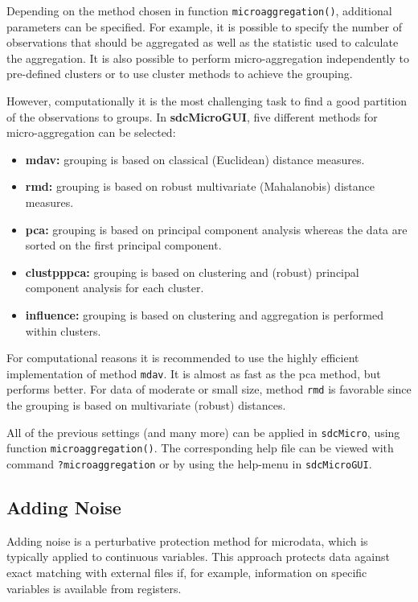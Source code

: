 \documentclass[12pt]{scrartcl}\usepackage[]{graphicx}\usepackage[]{color}
\newcommand{\pkg}[1]{\textbf{#1}}
\newcommand{\sdcMicro}{\texttt{sdcMicro}}
\newcommand{\sdcMicroGUI}{\texttt{sdcMicroGUI}}
\begin{document}
Depending on the method chosen in function \lstinline{microaggregation()}, additional parameters can be specified. For example, it is possible to specify the number of observations that should be aggregated as well as the statistic used to calculate the aggregation. It is also possible to perform micro-aggregation independently to pre-defined clusters or to use cluster methods to achieve the grouping.

However, computationally it is the most challenging task to find a good partition of the observations to groups. In \pkg{sdcMicroGUI}, five different methods for micro-aggregation can be selected:

\begin{itemize}
\item \textbf{mdav:} grouping is based on classical (Euclidean) distance measures.
\item \textbf{rmd:} grouping is based on robust multivariate (Mahalanobis) distance measures.
\item \textbf{pca:} grouping is based on principal component analysis whereas the data are sorted on the first principal component.
\item \textbf{clustpppca:} grouping is based on clustering and (robust) principal component analysis for each cluster.
\item \textbf{influence:} grouping is based on clustering and aggregation is performed within clusters.
\end{itemize}

For computational reasons it is recommended to use the highly efficient implementation of method \texttt{mdav}. It is almost as fast as the pca method, but performs better. For data of moderate or small size, method \texttt{rmd} is favorable since the grouping is based on multivariate (robust) distances.

All of the previous settings (and many more) can be applied in  \sdcMicro , using function \lstinline{microaggregation()}. The corresponding help file can be viewed with command \lstinline{?microaggregation}
or by using the help-menu in \sdcMicroGUI.

\subsection{Adding Noise}\label{method:noise}
Adding noise is a perturbative protection method for microdata, which is typically applied to continuous variables. This approach protects data against exact matching with external files if, for example, information on specific variables is available from registers.
\end{document}
